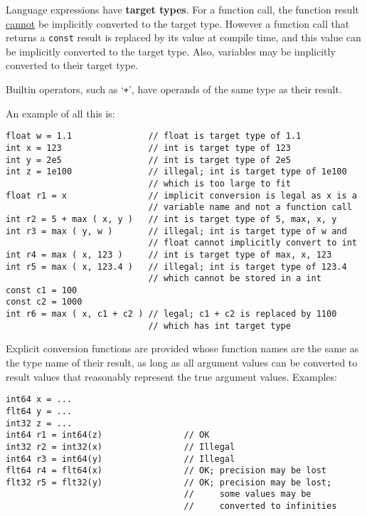 \documentclass[12pt]{article}
\newcommand{\skey}[2]{{\rm \bfseries #1#2}}
\newenvironment{indpar}[1][0.3in]%
	{\begin{list}{}%
		     {\setlength{\itemsep}{0in}%
		      \setlength{\topsep}{0in}%
		      \setlength{\parsep}{1ex}%
		      \setlength{\labelwidth}{#1}%
		      \setlength{\leftmargin}{#1}%
		      \addtolength{\leftmargin}{\labelsep}}%
	 \item}%
	{\end{list}}
\begin{document}
Language expressions have \skey{target type}s.
For a function call, the function result \underline{cannot}
be implicitly converted to the target type.
However a function call that returns a {\tt const}
result is replaced by its value at compile time, and this value
can be implicitly converted to the target type.  Also, variables
may be implicitly converted to their target type.

Builtin operators, such as `{\tt +}',
have operands of the same type as their result.

An example of all this is:

\begin{indpar}\begin{verbatim}
float w = 1.1               // float is target type of 1.1
int x = 123                 // int is target type of 123
int y = 2e5                 // int is target type of 2e5
int z = 1e100               // illegal; int is target type of 1e100
                            // which is too large to fit
float r1 = x                // implicit conversion is legal as x is a
                            // variable name and not a function call
int r2 = 5 + max ( x, y )   // int is target type of 5, max, x, y
int r3 = max ( y, w )       // illegal; int is target type of w and
                            // float cannot implicitly convert to int
int r4 = max ( x, 123 )     // int is target type of max, x, 123
int r5 = max ( x, 123.4 )   // illegal; int is target type of 123.4
                            // which cannot be stored in a int
const c1 = 100
const c2 = 1000
int r6 = max ( x, c1 + c2 ) // legal; c1 + c2 is replaced by 1100
                            // which has int target type
\end{verbatim}\end{indpar}

Explicit conversion functions are provided whose function names
are the same as the type name of their result, as long as
all argument values can be converted to result values that reasonably
represent the true argument values.
Examples:

\begin{indpar}\begin{verbatim}
int64 x = ...
flt64 y = ...
int32 z = ...
int64 r1 = int64(z)                // OK
int32 r2 = int32(x)                // Illegal
int64 r3 = int64(y)                // Illegal
flt64 r4 = flt64(x)                // OK; precision may be lost
flt32 r5 = flt32(y)                // OK; precision may be lost;
                                   //     some values may be
                                   //     converted to infinities
\end{verbatim}\end{indpar}
\end{document}
